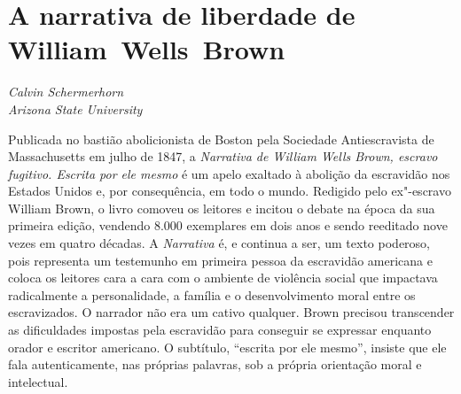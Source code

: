 \chapter*{A narrativa de liberdade de William~Wells~Brown}

\begin{flushright}
\emph{Calvin Schermerhorn}\\
\emph{Arizona State University}
\end{flushright}

Publicada no bastião abolicionista de Boston
pela Sociedade Antiescravista de Massachusetts em julho de 1847, a
\emph{Narrativa de William Wells Brown, escravo fugitivo. Escrita
por ele mesmo} é um apelo exaltado à abolição da escravidão nos Estados
Unidos e, por consequência, em todo o mundo. Redigido pelo ex"-escravo
William Brown, o livro comoveu os leitores e incitou o debate na época
da sua primeira edição, vendendo 8.000 exemplares em dois anos e sendo
reeditado nove vezes em quatro décadas. A \emph{Narrativa} é, e continua
a ser, um texto poderoso, pois representa um testemunho em primeira
pessoa da escravidão americana e coloca os leitores cara a cara com o
ambiente de violência social que impactava radicalmente a personalidade,
a família e o desenvolvimento moral entre os escravizados. O narrador
não era um cativo qualquer. Brown precisou transcender as dificuldades
impostas pela escravidão para conseguir se expressar enquanto orador e
escritor americano. O subtítulo, ``escrita por ele mesmo'', insiste que
ele fala autenticamente, nas próprias palavras, sob a própria orientação
moral e intelectual.

